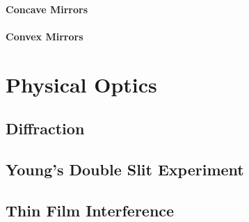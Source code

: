 		\paragraph{Concave Mirrors} 
		
		
				
		\paragraph{Convex Mirrors} 
		
		
	\section{Physical Optics}
		\subsection{Diffraction}
		\subsection{Young's Double Slit Experiment}
		\subsection{Thin Film Interference}
		
		
		
	

	


